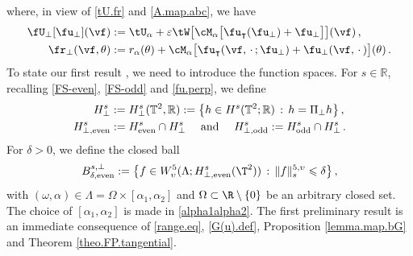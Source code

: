 \documentclass[a4paper,reqno,10pt]{article}
\begin{document}
where, in view of    \eqref{tU.fr} and \eqref{A.map.abc}, we have 
\begin{equation}
	\begin{aligned}
		\fU_{\perp}[\fu_{\perp}](\vf)& := \tU_{\alpha} + \varepsilon\tW\big[ \cM_{\alpha}\big[ \fu_{\intercal}(\fu_{\perp}) + \fu_{\perp} \big] \big](\vf)\,, \\
		\fr_{\perp}(\vf,\theta) & := r_\alpha(\theta) + \cM_{\alpha}\big[ \fu_{\intercal}(\vf,\,\cdot\,;\fu_{\perp}) + \fu_{\perp}(\vf,\,\cdot\,)  \big](\theta)\,.
	\end{aligned}
\end{equation}
To state our first result , we need to introduce the function spaces.
For $s\in\mathbb{R}$, recalling \eqref{FS-even}, \eqref{FS-odd} and \eqref{fu.perp}, we define
\begin{align}
	H_\perp^{s}&:=H_{\perp}^{s}(\mathbb{T}^{2},\mathbb{R}):=\big\{ h\in H^{s}(\mathbb{T}^{2};\mathbb{R}) \, : \, h = \Pi_{\perp} h \big\}\,, \label{Hnormal.def} \\
	H^{s}_{\perp,{\rm even}}& :=H^{s}_{{\rm even}}\cap H^s_{\perp}\quad \textnormal{ and }\quad H^{s}_{\perp,{\rm odd}}:=H^{s}_{{\rm odd}}\cap H^s_{\perp} \,. \label{Hs-normal}
\end{align}
For $\delta>0$, we define the closed ball
\begin{equation*}
	B_{\delta,{\rm even}}^{s,\perp} := \big\{ f \in W_\upsilon^5(\Lambda;H^s_{\perp,{\rm even}}(\T^2)) \, : \,  \| f\|_{s}^{5,\upsilon}\leqslant \delta \big\}\,,
\end{equation*}
with $(\omega,\alpha)\in\Lambda=\Omega\times[\alpha_1,\alpha_2]$ and  $\Omega\subset \R\setminus\{0\}$ be an arbitrary closed set. The choice of $[\alpha_{1},\alpha_{2}]$ is made in \eqref{alpha1alpha2}.
The first preliminary result is an immediate consequence of \eqref{range.eq}, \eqref{G(u).def}, Proposition \ref{lemma.map.bG} and Theorem \ref{theo.FP.tangential}.
\end{document}
